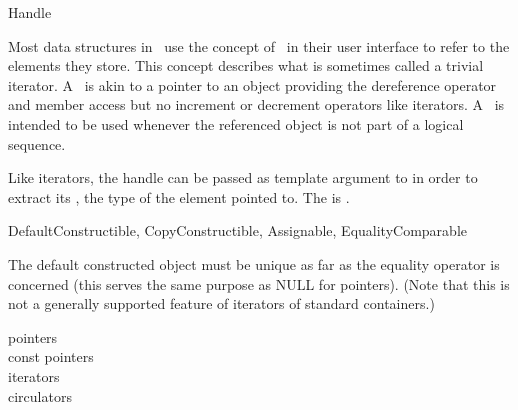 
\begin{ccRefConcept}{Handle}


\ccDefinition
  
Most data structures in \cgal\ use the concept of \ccRefName\ in their user
interface to refer to the elements they store.  This concept describes what is
sometimes called a trivial iterator.  A \ccRefName\ is akin to a pointer to
an object providing the dereference operator  and member
access  but no increment or decrement operators like
iterators.  A \ccRefName\ is intended to be used whenever the referenced
object is not part of a logical sequence.
 
Like iterators, the handle can be passed as template argument to
 in order to extract its ,
the type of the element pointed to.
The  is .

\ccRefines DefaultConstructible, CopyConstructible, Assignable, EqualityComparable

The default constructed object must be unique as far as the equality
operator is concerned (this serves the same purpose as NULL for pointers).
(Note that this is not a generally supported feature of iterators of
standard containers.)



\ccGlue
{}

\ccHasModels
pointers\\
const pointers\\
iterators\\
circulators

\end{ccRefConcept}
